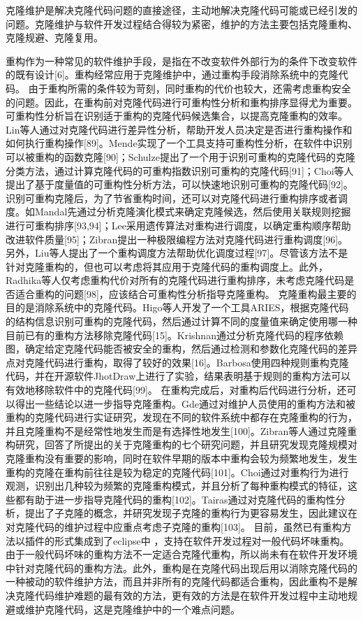 克隆维护是解决克隆代码问题的直接途径，主动地解决克隆代码可能或已经引发的问题。克隆维护与软件开发过程结合得较为紧密，维护的方法主要包括克隆重构、克隆规避、克隆复用。

重构作为一种常见的软件维护手段，是指在不改变软件外部行为的条件下改变软件的既有设计[6]。重构经常应用于克隆维护中，通过重构手段消除系统中的克隆代码。
由于重构所需的条件较为苛刻，同时重构的代价也较大，还需考虑重构安全的问题。因此，在重构前对克隆代码进行可重构性分析和重构排序显得尤为重要。可重构性分析旨在识别适于重构的克隆代码候选集合，以提高克隆重构的效率。Lin等人通过对克隆代码进行差异性分析，帮助开发人员决定是否进行重构操作和如何执行重构操作[89]。Mende实现了一个工具支持可重构性分析，在软件中识别可以被重构的函数克隆[90]；Schulze提出了一个用于识别可重构的克隆代码的克隆分类方法，通过计算克隆代码的可重构指数识别可重构的克隆代码[91]；Choi等人提出了基于度量值的可重构性分析方法，可以快速地识别可重构的克隆代码[92]。识别可重构克隆后，为了节省重构时间，还可以对克隆代码进行重构排序或者调度。如Mandal先通过分析克隆演化模式来确定克隆候选，然后使用关联规则挖掘进行可重构排序[93,94]；Lee采用遗传算法对重构进行调度，以确定重构顺序帮助改进软件质量[95]；Zibran提出一种极限编程方法对克隆代码进行重构调度[96]。另外，Liu等人提出了一个重构调度方法帮助优化调度过程[97]。尽管该方法不是针对克隆重构的，但也可以考虑将其应用于克隆代码的重构调度上。此外，Radhika等人仅考虑重构代价对所有的克隆代码进行重构排序，未考虑克隆代码是否适合重构的问题[98]，应该结合可重构性分析指导克隆重构。
克隆重构最主要的目的是消除系统中的克隆代码。Higo等人开发了一个工具ARIES，根据克隆代码的结构信息识别可重构的克隆代码，然后通过计算不同的度量值来确定使用哪一种目前已有的重构方法移除克隆代码[15]。Krishnan通过分析克隆代码的程序依赖图，确定给定克隆代码能否被安全的重构，然后通过检测和参数化克隆代码的差异点对克隆代码进行重构，取得了较好的效果[16]。Barbosa使用四种规则重构克隆代码，并在开源软件JhotDraw上进行了实验，结果表明基于规则的重构方法可以有效地移除软件中的克隆代码[99]。
在重构完成后，对重构后代码进行分析，还可以得出一些结论以进一步指导克隆重构。Gde通过对维护人员使用的重构方法和被重构的克隆代码进行实证研究，发现在不同的软件系统中都存在克隆重构的行为，并且克隆重构不是经常性地发生而是有选择性地发生[100]。Zibran等人通过克隆重构研究，回答了所提出的关于克隆重构的七个研究问题，并且研究发现克隆规模对克隆重构没有重要的影响，同时在软件早期的版本中重构会较为频繁地发生，发生重构的克隆在重构前往往是较为稳定的克隆代码[101]。Choi通过对重构行为进行观测，识别出几种较为频繁的克隆重构模式，并且分析了每种重构模式的特征，这些都有助于进一步指导克隆代码的重构[102]。Tairas通过对克隆代码的重构性分析，提出了子克隆的概念，并研究发现子克隆的重构行为更容易发生，因此建议在对克隆代码的维护过程中应重点考虑子克隆的重构[103]。
目前，虽然已有重构方法以插件的形式集成到了eclipse中 ，支持在软件开发过程对一般代码坏味重构。由于一般代码坏味的重构方法不一定适合克隆代重构，所以尚未有在软件开发环境中针对克隆代码的重构方法。此外，重构是在克隆代码出现后用以消除克隆代码的一种被动的软件维护方法，而且并非所有的克隆代码都适合重构，因此重构不是解决克隆代码维护难题的最有效的方法，更有效的方法是在软件开发过程中主动地规避或维护克隆代码，这是克隆维护中的一个难点问题。


